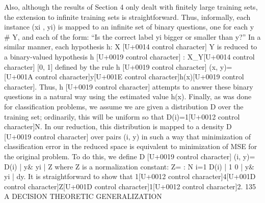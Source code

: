 \documentclass[10pt]{article}
\begin{document}
\begin{ReviewVerbatim}
Also, although the results of Section 4 only dealt with
finitely large training sets, the extension to infinite training
sets is straightforward.
Thus, informally, each instance (xi , yi) is mapped to an
infinite set of binary questions, one for each y # Y, and each
of the form: ``Is the correct label yi bigger or smaller than y?''
In a similar manner, each hypothesis h: X [U+0014 control character] Y is reduced
to a binary-valued hypothesis h
[U+0019 control character] : X_Y[U+0014 control character] [0, 1] defined by
the rule
h
[U+0019 control character] (x, y)=[U+001A control character]y[U+001E control character]h(x)[U+0019 control character].
Thus, h
[U+0019 control character] attempts to answer these binary questions in a
natural way using the estimated value h(x).
Finally, as was done for classification problems, we
assume we are given a distribution D over the training set;
ordinarily, this will be uniform so that D(i)=1[U+0012 control character]N. In our
reduction, this distribution is mapped to a density D
[U+0019 control character] over
pairs (i, y) in such a way that minimization of classification
error in the reduced space is equivalent to minimization of
MSE for the original problem. To do this, we define
D
[U+0019 control character] (i, y)=
D(i) | y& yi |
Z
where Z is a normalization constant:
Z= :
N
i=1
D(i) |
1
0
| y& yi | dy.
It is straightforward to show that 1[U+0012 control character]4[U+001D control character]Z[U+001D control character]1[U+0012 control character]2.
135
A DECISION THEORETIC GENERALIZATION


\end{ReviewVerbatim}
\end{document}
